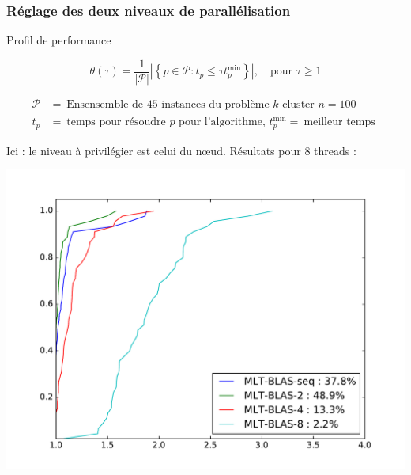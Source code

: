 \documentclass{beamer}
\newcommand{\set}[1]{\left\{ #1 \right\}}
\begin{document}
\begin{frame}
	\frametitle{Réglage des deux niveaux de parallélisation}

\begin{block}{Profil de performance}
\begin{small}
\[
	\theta(\tau) = \frac{1}{|\mathcal{P}|} \left| \set{ p \in \mathcal{P} : t_{p} \leq \tau t_{p}^{\min} } \right|, \quad \text{pour $\tau \geq 1$}
\]

\vspace{-7mm}
\begin{align*}
\mathcal{P} &= \ \text{Ensensemble de 45 instances du problème $k$-cluster $n=100$} \\
t_p &= \ \text{temps pour résoudre $p$ pour l'algorithme, } t_p^{\min}= \ \text{meilleur temps }
\end{align*}
\end{small}
\vspace{-7mm}
\end{block}


\alert{Ici :} le niveau à privilégier est celui du n\oe ud. Résultats pour $8$ threads :

\includegraphics[scale=0.33]{fig/MLT-BLAS.pdf} 

\end{frame}
\end{document}
